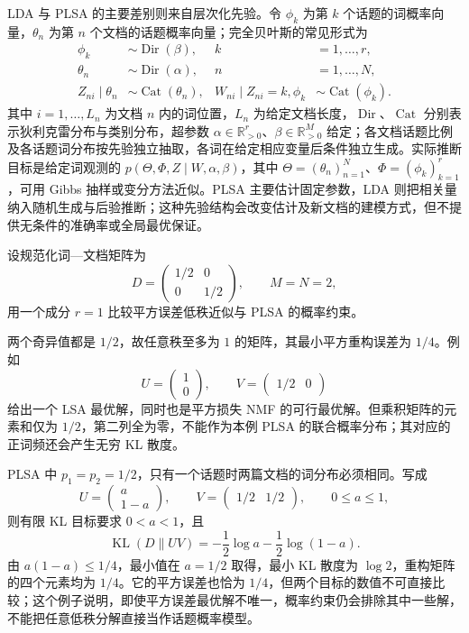 LDA 与 PLSA 的主要差别则来自层次化先验。令 $\phi_k$ 为第 $k$ 个话题的词概率向量，$\theta_n$ 为第 $n$ 个文档的话题概率向量；完全贝叶斯的常见形式为
\begin{equation}
\label{eq:lh-unsup-lda-generative}
\begin{aligned}
    \phi_k&\sim\operatorname{Dir}(\beta), & k&=1,\ldots,r,\\
    \theta_n&\sim\operatorname{Dir}(\alpha), & n&=1,\ldots,N,\\
    Z_{ni}\mid\theta_n&\sim\operatorname{Cat}(\theta_n),&
    W_{ni}\mid Z_{ni}=k,\phi_k&\sim\operatorname{Cat}(\phi_k).
\end{aligned}
\end{equation}
其中 $i=1,\ldots,L_n$ 为文档 $n$ 内的词位置，$L_n$ 为给定文档长度，$\operatorname{Dir}$、$\operatorname{Cat}$ 分别表示狄利克雷分布与类别分布，超参数 $\alpha\in\mathbb R_{>0}^{r}$、$\beta\in\mathbb R_{>0}^{M}$ 给定；各文档话题比例及各话题词分布按先验独立抽取，各词在给定相应变量后条件独立生成。实际推断目标是给定词观测的 $p(\Theta,\Phi,Z\mid W,\alpha,\beta)$，其中 $\Theta=(\theta_n)_{n=1}^{N}$、$\Phi=(\phi_k)_{k=1}^{r}$，可用 Gibbs 抽样或变分方法近似。PLSA 主要估计固定参数，LDA 则把相关量纳入随机生成与后验推断；这种先验结构会改变估计及新文档的建模方式，但不提供无条件的准确率或全局最优保证。

\begin{example}
\label{ex:lh-unsup-factor-constraints}
设规范化词---文档矩阵为
\[
    D=\begin{pmatrix}1/2&0\\0&1/2\end{pmatrix},\qquad M=N=2,
\]
用一个成分 $r=1$ 比较平方误差低秩近似与 PLSA 的概率约束。
\end{example}

\begin{solve}
两个奇异值都是 $1/2$，故任意秩至多为 $1$ 的矩阵，其最小平方重构误差为 $1/4$。例如
\[
    U=\begin{pmatrix}1\\0\end{pmatrix},\qquad
    V=\begin{pmatrix}1/2&0\end{pmatrix}
\]
给出一个 LSA 最优解，同时也是平方损失 NMF 的可行最优解。但乘积矩阵的元素和仅为 $1/2$，第二列全为零，不能作为本例 PLSA 的联合概率分布；其对应的正词频还会产生无穷 KL 散度。

PLSA 中 $p_1=p_2=1/2$，只有一个话题时两篇文档的词分布必须相同。写成
\[
    U=\begin{pmatrix}a\\1-a\end{pmatrix},\qquad
    V=\begin{pmatrix}1/2&1/2\end{pmatrix},\qquad0\leq a\leq1,
\]
则有限 KL 目标要求 $0<a<1$，且
\[
    \operatorname{KL}(D\|UV)
    =-\frac12\log a-\frac12\log(1-a).
\]
由 $a(1-a)\leq1/4$，最小值在 $a=1/2$ 取得，最小 KL 散度为 $\log2$，重构矩阵的四个元素均为 $1/4$。它的平方误差也恰为 $1/4$，但两个目标的数值不可直接比较；这个例子说明，即使平方误差最优解不唯一，概率约束仍会排除其中一些解，不能把任意低秩分解直接当作话题概率模型。
\end{solve}

